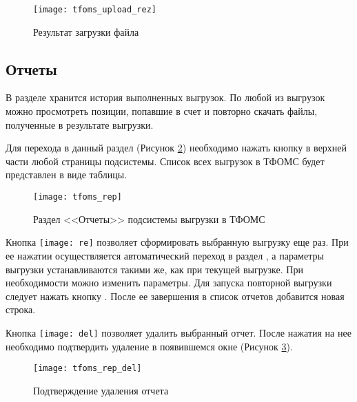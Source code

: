\begin{figure}[ht]\centering
 \texttt{[image: tfoms\_upload\_rez]}
 \caption{Результат загрузки файла}
 \label{img_tfoms_upload_rez}
\end{figure}

\subsection{Отчеты}

В разделе  хранится история выполненных выгрузок. По любой из выгрузок можно просмотреть позиции, попавшие в счет и повторно скачать файлы, полученные в результате выгрузки.

Для перехода в данный раздел (Рисунок \ref{img_tfoms_rep}) необходимо нажать кнопку   в верхней части любой страницы подсистемы. Список всех выгрузок в ТФОМС будет представлен в виде таблицы.

\begin{figure}[ht]\centering
 \texttt{[image: tfoms\_rep]}
 \caption{Раздел <<Отчеты>> подсистемы выгрузки в ТФОМС}
 \label{img_tfoms_rep}
\end{figure}

Кнопка \texttt{[image: re]} позволяет сформировать выбранную выгрузку еще раз. При ее нажатии осуществляется автоматический переход в раздел , а параметры выгрузки устанавливаются такими же, как при текущей выгрузке. При необходимости можно изменить параметры. Для запуска повторной выгрузки следует нажать кнопку . После ее завершения в список отчетов добавится новая строка.

Кнопка \texttt{[image: del]}  позволяет удалить выбранный отчет. После нажатия на нее необходимо подтвердить удаление в появившемся окне (Рисунок \ref{img_tfoms_rep_del}).

\begin{figure}[ht]\centering
 \texttt{[image: tfoms\_rep\_del]}
 \caption{Подтверждение удаления отчета}
 \label{img_tfoms_rep_del}
\end{figure}

